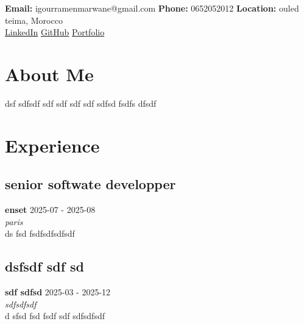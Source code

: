 \documentclass[11pt,a4paper]{article}
\begin{document}
\begin{center}
\end{center}

\vspace{1em}

\begin{center}
\textbf{Email:} igourramenmarwane@gmail.com \quad
\textbf{Phone:} 0652052012 \quad
\textbf{Location:} ouled teima, Morocco\\
\href{https://linkedin.com/in/yourprofile}{LinkedIn} \quad
\href{https://github.com/yourusername}{GitHub} \quad
\href{https://yourportfolio.com}{Portfolio}
\end{center}


\section{About Me}
dsf sdfsdf sdf sdf sdf sdf sdfsd fsdfs dfsdf 



\section{Experience}

\subsection{senior softwate developper}
\textcolor{primary}{\textbf{enset}} \hfill \textcolor{secondary}{2025-07 - 2025-08}\\
\textit{paris}\\
ds fsd fsdfsdfsdfsdf\\

\subsection{dsfsdf sdf sd}
\textcolor{primary}{\textbf{sdf sdfsd }} \hfill \textcolor{secondary}{2025-03 - 2025-12}\\
\textit{sdfsdfsdf}\\
d sfsd fsd fsdf sdf sdfsdfsdf\\
\end{document}
